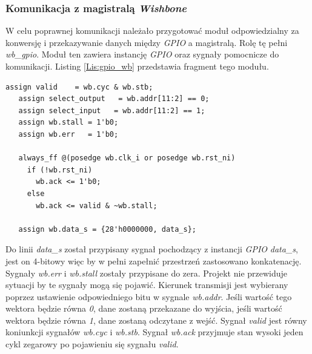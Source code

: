 \documentclass[11pt,a4paper]{article}
\begin{document}
		\subsubsection{Komunikacja z magistralą \textit{Wishbone}}
		\hspace{5mm}	W celu poprawnej komunikacji należało przygotować moduł odpowiedzialny za konwersję i przekazywanie danych między \textit{GPIO} a magistralą. Rolę tę pełni \textit{wb\_gpio}. Moduł ten zawiera instancję \textit{GPIO} oraz sygnały pomocnicze do komunikacji. Listing \ref{Lis:gpio_wb} przedstawia fragment tego modułu.\\
									\begin{minipage}{\textwidth}
\begin{scriptsize}
\begin{lstlisting}[label=Lis:gpio_wb,caption=Komunikacja \textit{GPIO} z magistralą]
   assign valid    = wb.cyc & wb.stb;
   assign select_output   = wb.addr[11:2] == 0;
   assign select_input   = wb.addr[11:2] == 1;
   assign wb.stall = 1'b0;
   assign wb.err   = 1'b0;

   always_ff @(posedge wb.clk_i or posedge wb.rst_ni)
     if (!wb.rst_ni)
       wb.ack <= 1'b0;
     else
       wb.ack <= valid & ~wb.stall;

   assign wb.data_s = {28'h0000000, data_s};   
\end{lstlisting}
\end{scriptsize}
\end{minipage}
		Do linii \textit{data\_s} został przypisany sygnał pochodzący z instancji \textit{GPIO} \textit{data\_s}, jest on 4-bitowy więc by w pełni zapełnić przestrzeń zastosowano konkatenację. Sygnały \textit{wb.err} i \textit{wb.stall} zostały przypisane do zera. Projekt nie przewiduje sytuacji by te sygnały mogą się pojawić. Kierunek transmisji jest wybierany poprzez ustawienie odpowiedniego bitu w sygnale \textit{wb.addr}. Jeśli wartość tego wektora będzie równa \textit{0}, dane zostaną przekazane do wyjścia, jeśli wartość wektora będzie równa \textit{1}, dane zostaną odczytane z wejść. Sygnał \textit{valid} jest równy koniunkcji sygnałów \textit{wb.cyc} i \textit{wb.stb}. Sygnał \textit{wb.ack} przyjmuje stan wysoki jeden cykl zegarowy po pojawieniu się sygnału \textit{valid}. 
\end{document}
